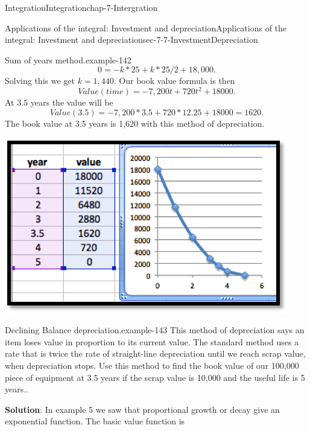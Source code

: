 \documentclass[oneside,10pt,]{book}
\newcommand{\terminology}[1]{\textbf{#1}}
\numberwithin{equation}{section}
\begin{document}
\begin{chapterptx}{Integration}{}{Integration}{}{}{chap-7-Intergration}
\begin{sectionptx}{Applications of the integral: Investment and depreciation}{}{Applications of the integral: Investment and depreciation}{}{}{sec-7-7-InvestmentDepreciation}
\begin{example}{Sum of years method.}{example-142}
%
\begin{equation*}
0=-k*25+k*25/2+18,000.
\end{equation*}
\hypertarget{p-3044}{}%
Solving this we get \(k = 1,440\).  Our book value formula is then%
%
\begin{equation*}
Value(time)=-7,200 t+720 t^2+18000.
\end{equation*}
\hypertarget{p-3045}{}%
At 3.5 years the value will be%
%
\begin{equation*}
Value(3.5)=-7,200*3.5+720*12.25+18000=1620.
\end{equation*}
\hypertarget{p-3046}{}%
The book value at 3.5 years is \textdollar{}1,620 with this method of depreciation.%
\begin{sidebyside}{1}{0.25}{0.25}{0}%
\begin{sbspanel}{0.5}%
\includegraphics[width=1\linewidth]{images/sec7-7-7.png}
\end{sbspanel}%
\end{sidebyside}%
\end{example}
\begin{example}{Declining Balance depreciation.}{example-143}%
\hypertarget{p-3047}{}%
This method of depreciation says an item loses value in proportion to its current value.  The standard method uses a rate that is twice the rate of straight-line depreciation until we reach scrap value, when depreciation stops.  Use this method to find the book value of our \textdollar{}100,000 piece of equipment at 3.5 years if the scrap value is \textdollar{}10,000 and the useful life is 5 years..%
\par
\hypertarget{p-3048}{}%
\terminology{Solution}: In example 5 we saw that proportional growth or decay give an exponential function.  The basic value function is%
%
\begin{equation*}

\end{equation*}
\end{example}
\end{sectionptx}
\end{chapterptx}
\end{document}
